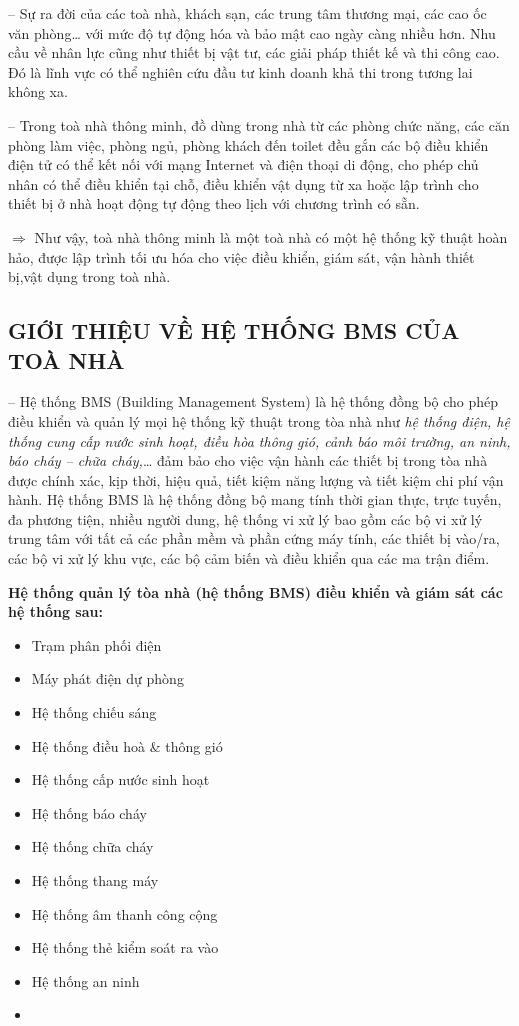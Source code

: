 	-- Sự ra đời của các toà nhà, khách sạn, các trung tâm thương mại, các cao ốc văn phòng… với mức độ tự động hóa và bảo mật cao ngày càng nhiều hơn. Nhu cầu về nhân lực cũng như thiết bị vật tư, các giải pháp thiết kế và thi công cao. Đó là lĩnh vực có thể nghiên cứu đầu tư kinh doanh khả thi trong tương lai không xa.
	
	-- Trong toà nhà thông minh, đồ dùng trong nhà từ các phòng chức năng, các căn phòng làm việc, phòng ngủ, phòng khách đến toilet đều gắn các bộ điều khiển điện tử có thể kết nối với mạng Internet và điện thoại di động, cho phép chủ nhân có thể điều khiển tại chỗ, điều khiển vật dụng từ xa hoặc lập trình cho thiết bị ở nhà hoạt động tự động theo lịch với chương trình có sẵn.
	
	{\large $\pmb{\Rightarrow}$} Như vậy, toà nhà thông minh là một toà nhà có một hệ thống kỹ thuật hoàn hảo, được lập trình tối ưu hóa cho việc điều khiển, giám sát, vận hành thiết bị,vật dụng trong toà nhà.	
	\subsection{GIỚI THIỆU VỀ HỆ THỐNG BMS CỦA TOÀ NHÀ}
	-- Hệ thống BMS (Building Management System) là hệ thống đồng bộ cho phép điều khiển và quản lý mọi hệ thống kỹ thuật trong tòa nhà như \emph{hệ thống điện, hệ thống cung cấp nước sinh hoạt, điều hòa thông gió, cảnh báo môi trường, an ninh, báo cháy – chữa cháy,}… đảm bảo cho việc vận hành các thiết bị trong tòa nhà được chính xác, kịp thời, hiệu quả, tiết kiệm năng lượng và tiết kiệm chi phí vận hành. Hệ thống BMS là hệ thống đồng bộ mang tính thời gian thực, trực tuyến, đa phương tiện, nhiều người dung, hệ thống vi xử lý bao gồm các bộ vi xử lý trung tâm với tất cả các phần mềm và phần cứng máy tính, các thiết bị vào/ra, các bộ vi xử lý khu vực, các bộ cảm biến và điều khiển qua các ma trận điểm.
	
	\break
	\textbf{Hệ thống quản lý tòa nhà (hệ thống BMS) điều khiển và giám sát các hệ thống sau:}
\begin{multicols}{2}
	\begin{itemize}
		\item Trạm phân phối điện
		\item Máy phát điện dự phòng
		\item Hệ thống chiếu sáng
		\item Hệ thống điều hoà \& thông gió
		\item Hệ thống cấp nước sinh hoạt
		\item Hệ thống báo cháy
		\item Hệ thống chữa cháy
		\item Hệ thống thang máy
		\item Hệ thống âm thanh công cộng
		\item Hệ thống thẻ kiểm soát ra vào
		\item Hệ thống an ninh
		\item[\vspace{\fill}] %
	\end{itemize}
\end{multicols}
	
